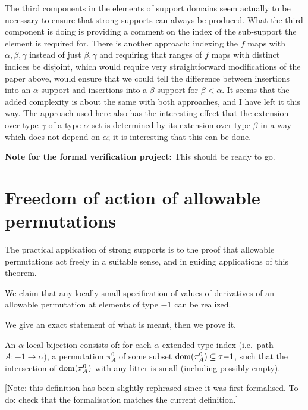 The third components in the elements of support domains seem actually to be necessary to ensure that strong supports can always be produced.  What the third component is doing is providing a comment on the index of the sub-support the element is required for.  There is another approach:  indexing the $f$ maps with $\alpha,\beta,\gamma$ instead of just $\beta,\gamma$ and requiring that ranges of $f$ maps with distinct indices be disjoint, which would require very straightforward modifications of the paper above, would ensure that we could tell the difference between insertions into an $\alpha$ support and insertions into a $\beta$-support for $\beta<\alpha$.  It seems that the added complexity is about the same with both approaches, and I have left it this way.  The approach used here also has the interesting effect that the extension over type $\gamma$ of a type $\alpha$ set is determined by its extension over type $\beta$ in a way which does not depend on $\alpha$;  it is interesting that this can be done.


{\bf Note for the formal verification project:}  This should be ready to go.

\newpage
\section{Freedom of action of allowable permutations}

The practical application of strong supports is to the proof that allowable permutations act freely in a suitable sense, and in guiding applications of this theorem.

We claim that any locally small specification of values of derivatives of an allowable permutation at elements of type $-1$ can be realized.

We give an exact statement of what is meant, then we prove it.

\begin{definition}
\label {def:local-bijection}
\leanok
{}
An $\alpha$-local bijection consists of: for each $\alpha$-extended type index (i.e.\ path $A : -1 \to \alpha$), a permutation $\pi^0_A$ of some subset $\mathrm{dom}(\pi^0_A) \subseteq \tau{-1}$, such that the intersection of $\mathrm{dom}(\pi^0_A)$ with any litter is small (including possibly empty).

[Note: this definition has been slightly rephrased since it was first formalised.  To do: check that the formalisation matches the current definition.]
\end{definition}

